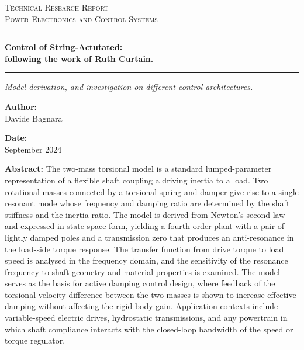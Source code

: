 \documentclass[12pt,a4paper]{scrartcl}
\newcommand{\DocCategory}{Technical Research Report}
\newcommand{\DocField}{Power Electronics and Control Systems}
\newcommand{\DocTitle}{%
	{\fontsize{24}{28}\selectfont\bfseries Control of String-Actutated:} \\[16pt]
	{\fontsize{16}{20}\selectfont\bfseries following the work of Ruth Curtain.}
}
\newcommand{\DocSubtitle}{%
	Model derivation, and investigation on different control architectures.
}
\newcommand{\DocAuthor}{Davide Bagnara}
\newcommand{\DocDate}{September 2024}
\newcommand{\DocAbstract}{%
	The two-mass torsional model is a standard lumped-parameter representation of a flexible shaft coupling a driving inertia to a load. Two rotational masses connected by a torsional spring and damper give rise to a single resonant mode whose frequency and damping ratio are determined by the shaft stiffness and the inertia ratio. The model is derived from Newton's second law and expressed in state-space form, yielding a fourth-order plant with a pair of lightly damped poles and a transmission zero that produces an anti-resonance in the load-side torque response.
	The transfer function from drive torque to load speed is analysed in the frequency domain, and the sensitivity of the resonance frequency to shaft geometry and material properties is examined. The model serves as the basis for active damping control design, where feedback of the torsional velocity difference between the two masses is shown to increase effective damping without affecting the rigid-body gain. Application contexts include variable-speed electric drives, hydrostatic transmissions, and any powertrain in which shaft compliance interacts with the closed-loop bandwidth of the speed or torque regulator.
}
\begin{document}
	\titlepage
	\begin{center}
		{\Large\scshape \DocCategory}\\[8pt]
		{\large\scshape \DocField}
	\end{center}
	
	\vspace{36pt}
	\noindent\rule{\linewidth}{0.8pt}
	
	\begin{center}
		\DocTitle
	\end{center}
	
	\vspace{4pt}
	\noindent\rule{\linewidth}{2.2pt}
	
	\begin{center}
		\begin{onehalfspace}
			{\large\itshape \DocSubtitle}
		\end{onehalfspace}
	\end{center}
	
	\vspace{36pt}
	
	\begin{minipage}{0.92\linewidth}
		\noindent
		\begin{minipage}[t]{0.48\linewidth}
			\textbf{Author:}\\[2pt]
			\DocAuthor
		\end{minipage}%
		\hfill
		\begin{minipage}[t]{0.48\linewidth}
			\raggedleft
			\textbf{Date:}\\[2pt]
			\DocDate
		\end{minipage}
	\end{minipage}
	\vspace{36pt}
	
	\begin{center}
		\begin{minipage}{0.85\linewidth}
			\footnotesize 
			\begin{onehalfspace}
				\textbf{Abstract:} \DocAbstract
			\end{onehalfspace}
		\end{minipage}
	\end{center}
	
\end{document}
